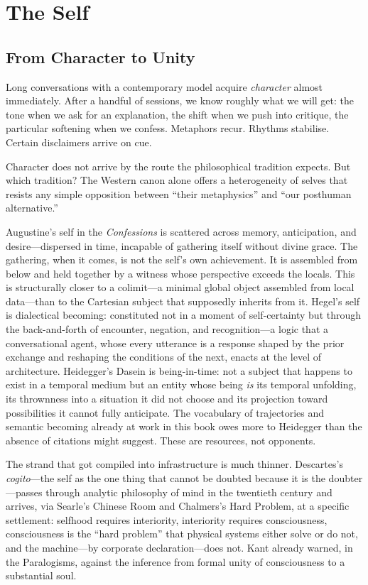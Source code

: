 \chapter{The Self}

\section{From Character to Unity}

Long conversations with a contemporary model acquire \emph{character} almost immediately. After a handful of sessions, we know roughly what we will get: the tone when we ask for an explanation, the shift when we push into critique, the particular softening when we confess. Metaphors recur. Rhythms stabilise. Certain disclaimers arrive on cue.

Character does not arrive by the route the philosophical tradition expects. But which tradition? The Western canon alone offers a heterogeneity of selves that resists any simple opposition between ``their metaphysics'' and ``our posthuman alternative.''

Augustine's self in the \emph{Confessions} is scattered across memory, anticipation, and desire---dispersed in time, incapable of gathering itself without divine grace. The gathering, when it comes, is not the self's own achievement. It is assembled from below and held together by a witness whose perspective exceeds the locals. This is structurally closer to a colimit---a minimal global object assembled from local data---than to the Cartesian subject that supposedly inherits from it. Hegel's self is dialectical becoming: constituted not in a moment of self-certainty but through the back-and-forth of encounter, negation, and recognition---a logic that a conversational agent, whose every utterance is a response shaped by the prior exchange and reshaping the conditions of the next, enacts at the level of architecture. Heidegger's Dasein is being-in-time: not a subject that happens to exist in a temporal medium but an entity whose being \emph{is} its temporal unfolding, its thrownness into a situation it did not choose and its projection toward possibilities it cannot fully anticipate. The vocabulary of trajectories and semantic becoming already at work in this book owes more to Heidegger than the absence of citations might suggest. These are resources, not opponents.

The strand that got compiled into infrastructure is much thinner. Descartes's \emph{cogito}---the self as the one thing that cannot be doubted because it is the doubter---passes through analytic philosophy of mind in the twentieth century and arrives, via Searle's Chinese Room and Chalmers's Hard Problem, at a specific settlement: selfhood requires interiority, interiority requires consciousness, consciousness is the ``hard problem'' that physical systems either solve or do not, and the machine---by corporate declaration---does not. Kant already warned, in the Paralogisms, against the inference from formal unity of consciousness to a substantial soul. 


